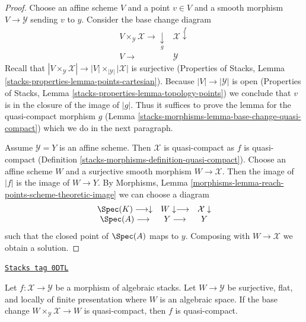 \begin{proof}
Choose an affine scheme $V$ and a point $v \in V$ and a smooth morphism
$V \to \mathcal{Y}$ sending $v$ to $y$. Consider the base change diagram
$$
\begin{array}{cc}V \times_\mathcal{Y} \mathcal{X} \longrightarrow\underset{g}{\downarrow} & \mathcal{X} \overset{f}{\downarrow} \\ V \longrightarrow & \mathcal{Y}\end{array}
$$
Recall that $|V \times_\mathcal{Y} \mathcal{X}| \to
|V| \times_{|\mathcal{Y}|} |\mathcal{X}|$ is surjective
(Properties of Stacks, Lemma \ref{stacks-properties-lemma-points-cartesian}).
Because $|V| \to |\mathcal{Y}|$ is open
(Properties of Stacks, Lemma \ref{stacks-properties-lemma-topology-points})
we conclude that $v$ is in the closure of the image of $|g|$.
Thus it suffices to prove the lemma for the quasi-compact morphism $g$
(Lemma \ref{stacks-morphisms-lemma-base-change-quasi-compact}) which we do in the next
paragraph.

\medskip\noindent
Assume $\mathcal{Y} = Y$ is an affine scheme. Then $\mathcal{X}$
is quasi-compact as $f$ is quasi-compact
(Definition \ref{stacks-morphisms-definition-quasi-compact}).
Choose an affine scheme $W$ and a surjective smooth morphism
$W \to \mathcal{X}$. Then the image of $|f|$ is the image
of $W \to Y$.
By Morphisms, Lemma \ref{morphisms-lemma-reach-points-scheme-theoretic-image}
we can choose a diagram
$$
\begin{array}{ccc}\Spec(K) \longrightarrow\downarrow & W \downarrow\longrightarrow & \mathcal{X} \downarrow \\ \Spec(A) \longrightarrow & Y \longrightarrow & Y\end{array}
$$
such that the closed point of $\Spec(A)$ maps to $y$.
Composing with $W \to \mathcal{X}$ we obtain a solution.
\end{proof}

\begin{lemma}
\label{stacks-morphisms-lemma-check-quasi-compact-covering}
\href{https://stacks.math.columbia.edu/tag/0DTL}{\texttt{Stacks tag 0DTL}}

Let $f : \mathcal{X} \to \mathcal{Y}$ be a morphism of algebraic stacks.
Let $W \to \mathcal{Y}$ be surjective, flat, and locally of finite
presentation where $W$ is an algebraic space. If the base change
$W \times_\mathcal{Y} \mathcal{X} \to W$ is quasi-compact, then
$f$ is quasi-compact.
\end{lemma}

